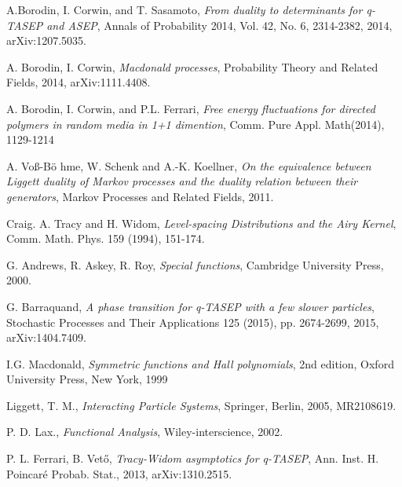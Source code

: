 \begin{singlespace}



\begin{thebibliography}{9}

  A.Borodin, I. Corwin, and T. Sasamoto,
  \emph{From duality to determinants for q-TASEP and ASEP},
  Annals of Probability 2014,
  Vol. 42, No. 6, 2314-2382,
  2014,
  arXiv:1207.5035.

  A. Borodin, I. Corwin,
  \emph{Macdonald processes},
  Probability Theory and Related Fields,
  2014,
  arXiv:1111.4408.

  A. Borodin, I. Corwin, and P.L. Ferrari,
  \emph{Free energy fluctuations for directed polymers in random media in 1+1 dimention},
  Comm. Pure Appl. Math(2014),
  1129-1214

  A. Vo\ss -B\"o hme, W. Schenk and A.-K. Koellner,
  \emph{On the equivalence between Liggett duality of Markov processes and the duality relation between their generators},
  Markov Processes and Related Fields,
  2011.

  Craig. A. Tracy and H. Widom,
  \emph{Level-spacing Distributions and the Airy Kernel},
  Comm. Math. Phys. 159 (1994),
  151-174.

  G. Andrews, R. Askey, R. Roy,
  \emph{Special functions},
  Cambridge University Press,
  2000.

  G. Barraquand,
  \emph{A phase transition for q-TASEP with a few slower particles},
  Stochastic Processes and Their Applications 125 (2015),
  pp. 2674-2699,
  2015,
  arXiv:1404.7409.

  I.G. Macdonald,
  \emph{Symmetric functions and Hall polynomials},
  2nd edition, 
  Oxford University Press,
  New York,
  1999

  Liggett, T. M.,
  \emph{Interacting Particle Systems},
  Springer,
  Berlin,
  2005,
  MR2108619.

  P. D. Lax.,
  \emph{Functional Analysis},
  Wiley-interscience,
  2002.

  P. L. Ferrari, B. Vet\H o,
  \emph{Tracy-Widom asymptotics for q-TASEP},
  Ann. Inst. H. Poincar\' e Probab. Stat.,
  2013,
  arXiv:1310.2515.

\end{thebibliography}

\end{singlespace}
